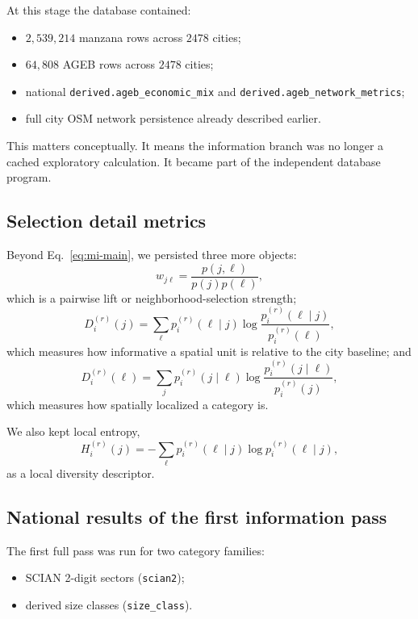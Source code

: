 \documentclass[11pt]{article}
\begin{document}
At this stage the database contained:
\begin{itemize}
\item \(2{,}539{,}214\) manzana rows across \(2478\) cities;
\item \(64{,}808\) AGEB rows across \(2478\) cities;
\item national \texttt{derived.ageb\_economic\_mix} and \texttt{derived.ageb\_network\_metrics};
\item full city OSM network persistence already described earlier.
\end{itemize}

This matters conceptually. It means the information branch was no longer a cached exploratory calculation. It became part of the independent database program.

\subsection{Selection detail metrics}

Beyond Eq.~\eqref{eq:mi-main}, we persisted three more objects:
\begin{equation}
w_{j\ell}
=
\frac{p(j,\ell)}{p(j)p(\ell)},
\label{eq:lift-def}
\end{equation}
which is a pairwise lift or neighborhood-selection strength;
\begin{equation}
D_i^{(r)}(j)
=
\sum_\ell p_i^{(r)}(\ell\mid j)\log\frac{p_i^{(r)}(\ell\mid j)}{p_i^{(r)}(\ell)},
\label{eq:unit-kl}
\end{equation}
which measures how informative a spatial unit is relative to the city baseline; and
\begin{equation}
D_i^{(r)}(\ell)
=
\sum_j p_i^{(r)}(j\mid \ell)\log\frac{p_i^{(r)}(j\mid \ell)}{p_i^{(r)}(j)},
\label{eq:cat-kl}
\end{equation}
which measures how spatially localized a category is.

We also kept local entropy,
\begin{equation}
H_i^{(r)}(j)
=
-\sum_\ell p_i^{(r)}(\ell\mid j)\log p_i^{(r)}(\ell\mid j),
\end{equation}
as a local diversity descriptor.

\subsection{National results of the first information pass}

The first full pass was run for two category families:
\begin{itemize}
\item SCIAN 2-digit sectors (\texttt{scian2});
\item derived size classes (\texttt{size\_class}).
\end{itemize}
\end{document}
